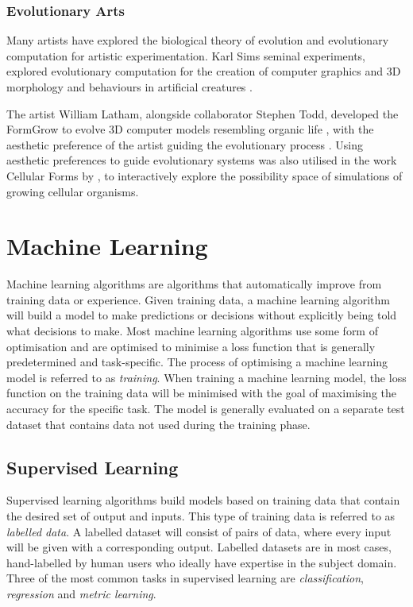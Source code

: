 \subsubsection{Evolutionary Arts}

Many artists have explored the biological theory of evolution and evolutionary computation for artistic experimentation.
Karl Sims seminal experiments, explored evolutionary computation for the creation of computer graphics \citep{sims1991artificial} and 3D morphology and behaviours in artificial creatures \citep{sims1994evolving, sims2023evolving}.

The artist William Latham, alongside collaborator Stephen Todd, developed the FormGrow to evolve 3D computer models resembling organic life \citep{latham1992evolutionary}, with the aesthetic preference of the artist guiding the evolutionary process \citep{lambert2013emergence}.
Using aesthetic preferences to guide evolutionary systems was also utilised in the work Cellular Forms by \citep{lomas2014cellular}, to interactively explore the possibility space of simulations of growing cellular organisms.

\section{Machine Learning}
\label{c2:sec:ml}
Machine learning algorithms are algorithms that automatically improve from training data or experience. 
Given training data, a machine learning algorithm will build a model to make predictions or decisions without explicitly being told what decisions to make. 
Most machine learning algorithms use some form of optimisation and are optimised to minimise a loss function that is generally predetermined and task-specific. 
The process of optimising a machine learning model is referred to as \emph{training}. 
When training a machine learning model, the loss function on the training data will be minimised with the goal of maximising the accuracy for the specific task. 
The model is generally evaluated on a separate test dataset that contains data not used during the training phase. 

\subsection{Supervised Learning}

Supervised learning algorithms build models based on training data that contain the desired set of output and inputs. 
This type of training data is referred to as \emph{labelled data}. 
A labelled dataset will consist of pairs of data, where every input will be given with a corresponding output. 
Labelled datasets are in most cases, hand-labelled by human users who ideally have expertise in the subject domain. 
Three of the most common tasks in supervised learning are \emph{classification}, \emph{regression} and \emph{metric learning}. 

